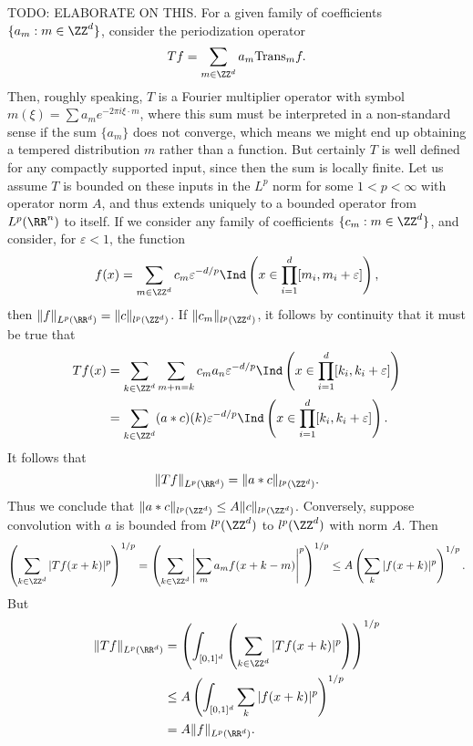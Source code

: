 \begin{example}
    TODO: ELABORATE ON THIS. For a given family of coefficients $\{ a_m : m \in \ZZ^d \}$, consider the periodization operator
    \[ Tf = \sum_{m \in \ZZ^d} a_m \text{Trans}_m f. \]
    Then, roughly speaking, $T$ is a Fourier multiplier operator with symbol $m(\xi) = \sum a_m e^{-2 \pi i \xi \cdot m}$, where this sum must be interpreted in a non-standard sense if the sum $\{ a_m \}$ does not converge, which means we might end up obtaining a tempered distribution $m$ rather than a function. But certainly $T$ is well defined for  any compactly supported input, since then the sum is locally finite. Let us assume $T$ is bounded on these inputs in the $L^p$ norm for some $1 < p < \infty$ with operator norm $A$, and thus extends uniquely to a bounded operator from $L^p(\RR^n)$ to itself. If we consider any family of coefficients $\{ c_m : m \in \ZZ^d \}$, and consider, for $\varepsilon < 1$, the function
    \[ f(x) = \sum_{m \in \ZZ^d} c_m \varepsilon^{-d/p} \Ind \left(x \in \prod_{i = 1}^d [m_i, m_i + \varepsilon] \right), \]
    then $\| f \|_{L^p(\RR^d)} = \| c \|_{l^p(\ZZ^d)}$. If $\| c_m \|_{l^p(\ZZ^d)}$, it follows by continuity that it must be true that
    \begin{align*}
        Tf(x) &= \sum_{k \in \ZZ^d} \sum_{m + n = k} c_m a_n \varepsilon^{-d/p} \Ind \left( x \in \prod_{i = 1}^d [k_i, k_i + \varepsilon] \right)\\
        &= \sum_{k \in \ZZ^d} (a * c)(k) \varepsilon^{-d/p} \Ind \left( x \in \prod_{i = 1}^d [k_i, k_i + \varepsilon] \right).
    \end{align*}
    It follows that
    \[ \| Tf \|_{L^p(\RR^d)} = \| a * c \|_{l^p(\ZZ^d)}. \]
    Thus we conclude that $\| a * c \|_{l^p(\ZZ^d)} \leq A \| c \|_{l^p(\ZZ^d)}$. Conversely, suppose convolution with $a$ is bounded from $l^p(\ZZ^d)$ to $l^p(\ZZ^d)$ with norm $A$. Then
    \[ \left( \sum_{k \in \ZZ^d} |Tf(x+k)|^p \right)^{1/p} = \left( \sum_{k \in \ZZ^d} \left| \sum_m a_m f(x + k - m) \right|^p \right)^{1/p} \leq A \left( \sum_k |f(x + k)|^p \right)^{1/p}. \]
    But
    \begin{align*}
        \| Tf \|_{L^p(\RR^d)} &= \left( \int_{[0,1]^d} \left( \sum_{k \in \ZZ^d} |Tf(x+k)|^p \right) \right)^{1/p}\\
        &\leq A \left( \int_{[0,1]^d} \sum_k |f(x+k)|^p \right)^{1/p}\\
        &= A \| f \|_{L^p(\RR^d)}.
    \end{align*}

\end{example}
